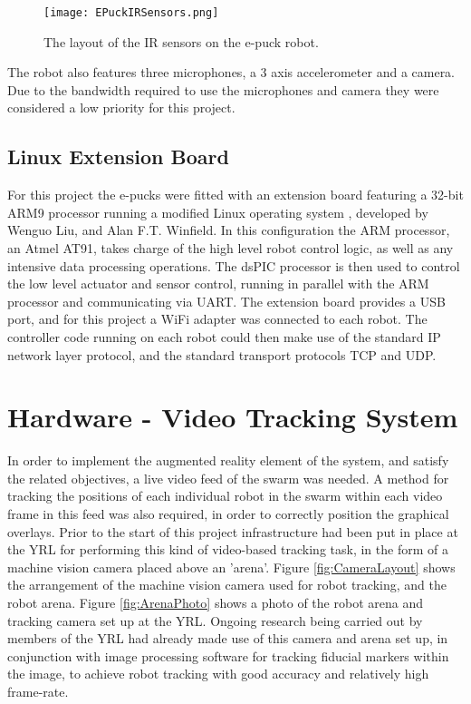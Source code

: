 \begin{figure}
	\begin{center}
	\texttt{[image: EPuckIRSensors.png]}
	\decoRule
	\caption[e-puck IR Sensor Layout]{The layout of the IR sensors on the e-puck robot.}
	\label{fig:EPuckIRSensors}
	\end{center}
\end{figure}

The robot also features three microphones, a 3 axis accelerometer and a camera. Due to the bandwidth required to use the microphones and camera they were considered a low priority for this project.


\subsection{Linux Extension Board} \label{LinuxExtensionBoard}
For this project the e-pucks were fitted with an extension board featuring a 32-bit ARM9 processor running a modified Linux operating system \cite{LinuxExtensionBoard}, developed by Wenguo Liu, and Alan F.T. Winfield. In this configuration the ARM processor, an Atmel AT91, takes charge of the high level robot control logic, as well as any intensive data processing operations. The dsPIC processor is then used to control the low level actuator and sensor control, running in parallel with the ARM processor and communicating via UART. The extension board provides a USB port, and for this project a WiFi adapter was connected to each robot. The controller code running on each robot could then make use of the standard IP network layer protocol, and the standard transport protocols TCP and UDP.



\section{Hardware - Video Tracking System}

In order to implement the augmented reality element of the system, and satisfy the related objectives, a live video feed of the swarm was needed. A method for tracking the positions of each individual robot in the swarm within each video frame in this feed was also required, in order to correctly position the graphical overlays. Prior to the start of this project infrastructure had been put in place at the YRL for performing this kind of video-based tracking task, in the form of a machine vision camera placed above an 'arena'. Figure \ref{fig:CameraLayout} shows the arrangement of the machine vision camera used for robot tracking, and the robot arena. Figure \ref{fig:ArenaPhoto} shows a photo of the robot arena and tracking camera set up at the YRL. Ongoing research being carried out by members of the YRL had already made use of this camera and arena set up, in conjunction with image processing software for tracking fiducial markers within the image, to achieve robot tracking with good accuracy and relatively high frame-rate.


